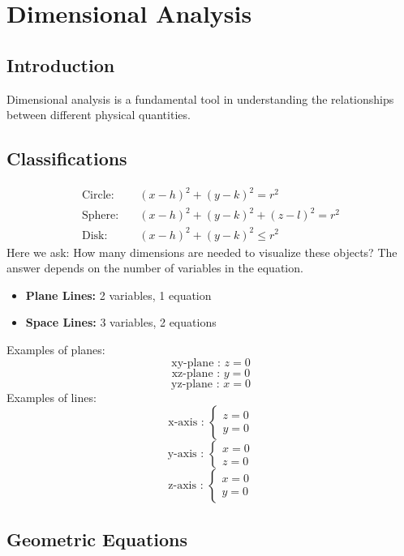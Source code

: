 \documentclass[a4paper,12pt,openany]{book}
\begin{document}
\chapter{Dimensional Analysis}

\section{Introduction}
Dimensional analysis is a fundamental tool in understanding the relationships between different physical quantities.

\section{Classifications}

\begin{align*}
    \text{Circle:} \quad & (x-h)^2 + (y-k)^2 = r^2 \\
    \text{Sphere:} \quad & (x-h)^2 + (y-k)^2 + (z-l)^2 = r^2 \\
    \text{Disk:} \quad & (x-h)^2 + (y-k)^2 \leq r^2
\end{align*}
Here we ask: How many dimensions are needed to visualize these objects? The answer depends on the number of variables in the equation.

\begin{itemize}
    \item{\textbf{Plane Lines:} 2 variables, 1 equation}
    \item{\textbf{Space Lines:} 3 variables, 2 equations}
\end{itemize}
Examples of planes:
\[
\text{xy-plane : } z = 0
\]
\[
\text{xz-plane : } y = 0
\]
\[
\text{yz-plane : } x = 0
\]
Examples of lines:
\[
\text{x-axis : }
\begin{cases}
    z = 0\\
    y = 0
\end{cases}
\]
\[
\text{y-axis : }
\begin{cases}
    x = 0\\
    z = 0
\end{cases}
\]
\[
\text{z-axis : }
\begin{cases}
    x = 0\\
    y = 0
\end{cases}
\]
\pagebreak
\section{Geometric Equations}
\end{document}
